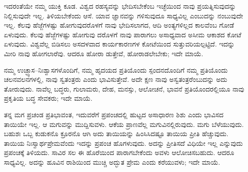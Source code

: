 ಇದರಂತೆಯೇ ನಮ್ಮ ಯುಕ್ತಿ ಕೂಡ. ವಿಶ್ವದ ರಹಸ್ಯವನ್ನು ಭೇದಿಸಬೇಕೆಂಬ ಇಚ್ಛೆಯಿಂದ ನಾವು ಪ್ರಯತ್ನಿಸುವುದನ್ನು ನಿಲ್ಲಿಸುವುದೇ ಇಲ್ಲ. ತಿಳಿಯಬೇಕೆಂದು ಆಸೆ. ಯಾವ ಜ್ಞಾನವನ್ನು ಗಳಿಸುವುದೂ ಸಾಧ್ಯವಿಲ್ಲ ಎಂಬುದನ್ನು ನಂಬುವುದೇ ಇಲ್ಲ. ಕೆಲವು ಹೆಜ್ಜೆಗಳಷ್ಟು ಹೋಗುವುದರೊಳಗೆ ನಾವು ಭೇದಿಸಲಾಗದ, ಆದಿ ಅಂತ್ಯಗಳಿಲ್ಲದ ಕಾಲವೆಂಬ ಗೋಡೆ ಏಳುವುದು. ಕೆಲವು ಹೆಜ್ಜೆಗಳಷ್ಟು ಹೋಗುವು ದರೊಳಗೆ ನಾವು ಪಾರಾಗಲು ಅಸಾಧ್ಯವಾದ ಅಸೀಮ ಆಕಾಶದ ಕೋಟೆ ಏಳುವುದು. ವಿಶ್ವವೆಲ್ಲ ಬಿಡಿಸಲು ಅಸದಳವಾದ ಕಾರ್ಯಕಾರಣಗಳ ಕೋಟೆಯಿಂದ ಸುತ್ತುವರಿಯಲ್ಪಟ್ಟಿದೆ. ಇದನ್ನು ಮೀರಿ ನಾವು ಹೋಗಲಾರೆವು. ಆದರೂ ಹೋರಾ ಡುತ್ತೇವೆ, ಹೋರಾಡಲೇಬೇಕು; ಇದೇ ಮಾಯೆ.

ನಮ್ಮ ಉಚ್ಛ್ವಾಸ–ನಿಃಶ್ವಾಸಗಳೊಂದಿಗೆ, ನಮ್ಮ ಹೃದಯದ ಪ್ರತಿಯೊಂದು ಸ್ಪಂದನದೊಂದಿಗೆ ನಮ್ಮ ಪ್ರತಿಯೊಂದು ಚಲನವಲನಗಳಲ್ಲಿ, ನಾವು ಸ್ವತಂತ್ರರು ಎಂದು ಭಾವಿಸುತ್ತೇವೆ. ಅದೇ ಕ್ಷಣ ನಾವು ಅಸ್ವತಂತ್ರರೆಂಬುದನ್ನು ಅದು ತೋರುವುದು. ನಾವೆಲ್ಲ ಬದ್ಧರು, ಗುಲಾಮರು, ದೇಹ, ಮನಸ್ಸು, ಆಲೋಚನೆ, ಭಾವನೆ ಪ್ರತಿಯೊಂದರಲ್ಲಿಯೂ ನಾವು ಪ್ರಕೃತಿಯ ಬದ್ಧ ಸೇವಕರು; ಇದೇ ಮಾಯೆ.

ತನ್ನ ಮಗ ಪ್ರಚಂಡ ಪ್ರತಿಭಾವಂತ, ಇದುವರೆಗೆ ಪ್ರಪಂಚದಲ್ಲಿ ಹುಟ್ಟದ ಅಸಾಧಾರಣ ಶಿಶು ಎಂದು ಭಾವಿಸದ ತಾಯಿಯೇ ಇಲ್ಲ. ಆ ಮಗುವನ್ನು ಮುದ್ದಿಸುವಳು. ಆಕೆಯ ಪ್ರಾಣವೆಲ್ಲ ಮಗುವಿನಲ್ಲಿರುವುದು. ಮಗು ಬೆಳೆಯುವುದು. ಬಹುಶಃ ಒಬ್ಬ ಕುಡುಕನೊ ಕ್ರೂರನೊ ಆಗಿ ಅದು ತಾಯಿಯನ್ನು ಹಿಂಸಿಸಿದಷ್ಟೂ ತಾಯಿಯ ಪ್ರೀತಿ ಹೆಚ್ಚುವುದು. ತಾಯಿಯ ನಿಃಸ್ವಾರ್ಥಪ್ರೇಮವೆಂದು ಇದನ್ನು ಪ್ರಪಂಚ ಹೊಗಳುವುದು. ಅದನ್ನು ಪ್ರೀತಿಸದೆ ವಿಧಿಯೇ ಇಲ್ಲ ಎನ್ನುವುದು ಪ್ರಪಂಚಕ್ಕೆ ತಿಳಿಯದು. ಸಾವಿರ ಸಲ ಈ ಹೊರೆಯಿಂದ ಪಾರಾಗಬೇಕೆಂದು ಅವಳು ಆಲೋಚಿಸಬಹುದು. ಆದರೂ ಸಾಧ್ಯವಿಲ್ಲ. ಅದನ್ನು ಹೂವಿನ ರಾಶಿಯಿಂದ ಮುಚ್ಚಿ ಅದ್ಭುತ ಪ್ರೇಮ ಎಂದು ಕರೆಯುವಳು; ಇದೇ ಮಾಯೆ.

